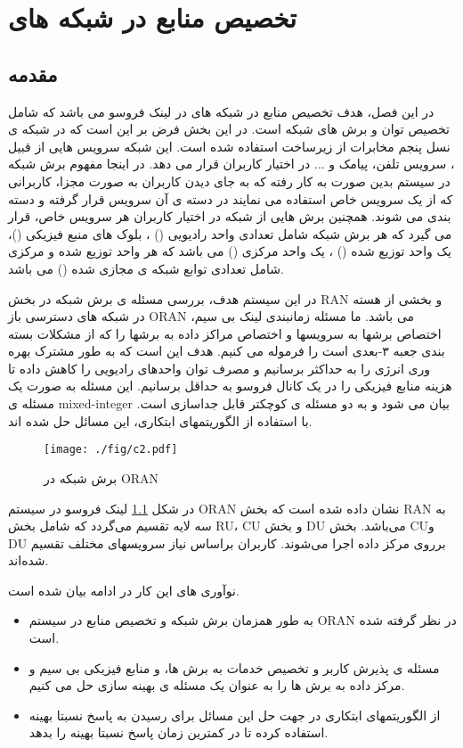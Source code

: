\chapter{تخصیص منابع در شبکه های }
\section{مقدمه}
در این فصل، هدف تخصیص منابع در شبکه های  در لینک فروسو می باشد که شامل تخصیص توان و برش های شبکه است.
در این بخش فرض بر این است که در شبکه ی نسل پنجم مخابرات از زیرساخت  استفاده شده است. این شبکه سرویس هایی از قبیل ، سرویس تلفن، پیامک و ... در اختیار کاربران قرار می دهد. در اینجا  مفهوم برش شبکه در سیستم بدین صورت به کار رفته که به جای دیدن کاربران به صورت مجزا، کاربرانی که از یک سرویس خاص استفاده می نمایند در دسته ی آن سرویس قرار گرفته و دسته بندی می شوند. همچنین برش هایی از شبکه در اختیار کاربران هر سرویس خاص، قرار می گیرد که هر برش شبکه شامل تعدادی واحد رادیویی
() 
،
بلوک های منبع فیزیکی
 ()، 
 یک واحد توزیع شده
() 
 ، 
 یک واحد مرکزی
()  
  می باشد که هر واحد توزیع شده و مرکزی شامل تعدادی توابع شبکه ی مجازی شده
() 
می باشد. 

در این سیستم هدف، بررسی مسئله ی برش شبکه در بخش RAN و بخشی از هسته در شبکه های دسترسی باز
ORAN
می باشد.
ما مسئله زمانبندی لینک بی سیم، اختصاص برشها به سرویسها و اختصاص مراکز داده به برشها را که از مشکلات بسته بندی جعبه  ۳-بعدی است را فرموله می کنیم. 
هدف این است که به طور مشترک بهره وری انرژی را به حداکثر برسانیم و مصرف توان واحدهای رادیویی را کاهش داده تا هزینه منابع فیزیکی را در یک کانال فروسو به حداقل برسانیم.
این مسئله به صورت یک مسئله ی 
mixed-integer
بیان می شود و به دو مسئله ی کوچکتر قابل جداسازی است. با استفاده از الگوریتمهای ابتکاری، این مسائل حل شده اند.
\begin{figure}
	\centering
	\texttt{[image: ./fig/c2.pdf]}
	\caption{برش شبکه در ORAN}
	\label{fig:c11}
\end{figure}
در شکل \ref{fig:c11}
لینک فروسو در سیستم ORAN نشان داده شده است که بخش RAN به سه لایه تقسیم می‌گردد که شامل بخش RU، 
CU و
بخش DU می‌باشد.
بخش CUو DU برروی مرکز داده اجرا می‌شوند. کاربران براساس نیاز سرویسهای مختلف تقسیم شده‌اند.

نوآوری های این کار در ادامه بیان شده است.
\begin{itemize}
\item 
به طور همزمان برش شبکه و تخصیص منابع در سیستم
 ORAN
  در نظر گرفته شده است.
\item 
مسئله ی پذیرش کاربر و تخصیص خدمات به برش ها، و منابع فیزیکی بی سیم و مرکز داده به برش ها را به عنوان یک مسئله ی بهینه سازی حل می کنیم.
\item
از الگوریتمهای ابتکاری در جهت حل این مسائل برای رسیدن به پاسخ نسبتا بهینه استفاده کرده تا در کمترین زمان پاسخ نسبتا بهینه را بدهد.
\end{itemize} 

